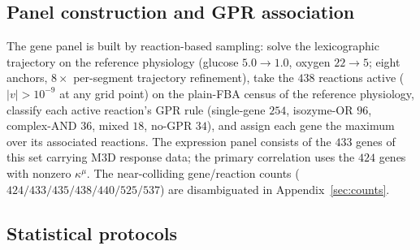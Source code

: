 \documentclass[11pt,a4paper]{article}
\theoremstyle{plain}
\theoremstyle{definition}
\theoremstyle{remark}
\newcommand{\kmu}{\kappa^{\mu}}
\begin{document}
\subsection{Panel construction and GPR association}

The gene panel is built by reaction-based sampling: solve the lexicographic trajectory on the reference physiology (glucose $5.0 \to
1.0$, oxygen $22 \to 5$; eight anchors, $8\times$ per-segment
trajectory refinement), take the $438$ reactions active
($|v| > 10^{-9}$ at any grid point) on the plain-FBA census of the
reference physiology,
classify each active reaction's GPR rule (single-gene $254$,
isozyme-OR $96$, complex-AND $36$, mixed $18$, no-GPR $34$), and
assign each gene the maximum over its associated reactions. The expression panel consists of the $433$ genes of this set carrying M3D response
data; the primary correlation uses the $424$ genes with nonzero
$\kmu$. The near-colliding gene/reaction counts
($424/433/435/438/440/525/537$) are disambiguated in Appendix~\ref{sec:counts}.

\subsection{Statistical protocols}
\end{document}
